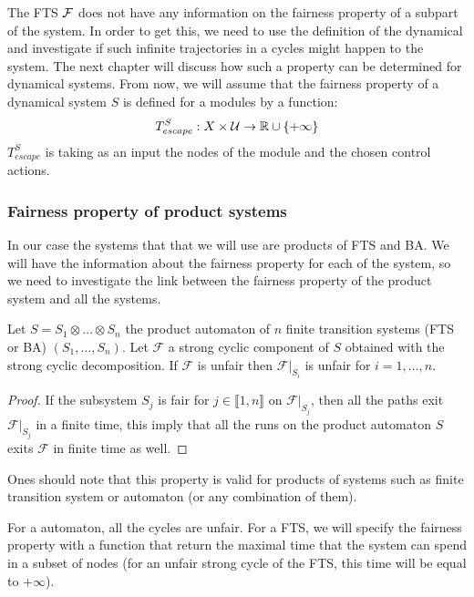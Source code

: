 The FTS $\mathcal{F}$ does not have any information on the fairness property of a subpart of the system. In order to get this, we need to use the definition of the dynamical and investigate if such infinite trajectories in a cycles might happen to the system.
The next chapter will discuss how such a property can be determined for dynamical systems.
From now, we will assume that the fairness property of a dynamical system $S$ is defined for a modules by a function:
\newcommand{\Tesc}{T_{escape}^S}%
\begin{equation}
\Tesc:X \times \U \rightarrow \R \cup \{+\infty\}
\end{equation}
$\Tesc$ is taking as an input the nodes of the module and the chosen control actions.


\subsubsection{Fairness property of product systems}
In our case the systems that that we will use are products of FTS and BA. We will have the information about the fairness property for each of the system, so we need to investigate the link between the fairness property of the product system and all the systems.

\begin{prop}
Let $S = S_1 \otimes \dots \otimes S_n$ the product automaton of $n$ finite transition systems (FTS or BA) $(S_1,\dots,S_n)$.
Let $\mathcal{F}$ a strong cyclic component of $S$ obtained with the strong cyclic decomposition.
If $\mathcal{F}$ is unfair then $\mathcal{F}|_{S_i}$ is unfair for $i = 1,\dots,n$.
\end{prop}

\begin{proof}
If the subsystem $S_j$ is fair for $j \in \llbracket 1,n \rrbracket$ on $\mathcal{F}|_{S_j}$, then all the paths exit $\mathcal{F}|_{S_j}$ in a finite time, this imply that all the runs on the product automaton $S$ exits $\mathcal{F}$ in finite time as well.
\end{proof}

Ones should note that this property is valid for products of systems such as finite transition system or \buchi{} automaton (or any combination of them).

For a \buchi{} automaton, all the cycles are unfair.
For a FTS, we will specify the fairness property with a function that return the maximal time that the system can spend in a subset of nodes
(for an unfair strong cycle of the FTS, this time will be equal to $+\infty$).

